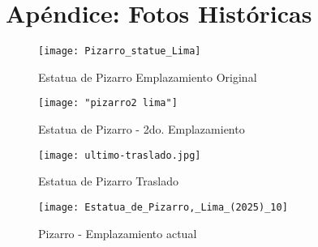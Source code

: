 \documentclass[a4paper,12pt]{article}
\begin{document}
\section*{Ap\'endice: Fotos Hist\'oricas}	
\begin{figure}[H]
	\centering
	\texttt{[image: Pizarro\_statue\_Lima]}
	\caption[Estatua de Pizarro - Ubicación Original]{Estatua de Pizarro Emplazamiento Original}
	\label{fig:pizarrostatuelima}
\end{figure}

\begin{figure}[H]
	\centering
	\texttt{[image: "pizarro2 lima"]}
	\caption[Estatua de pizarro - 2do. Emplazamiento]{Estatua de Pizarro - 2do. Emplazamiento}
	\label{fig:pizarro2-lima}
\end{figure}

\begin{figure}[H]
	\centering
	\texttt{[image: ultimo-traslado.jpg]}
	\caption[Estatua de pizarro -Traslado]{Estatua de Pizarro Traslado}	
\end{figure}

\begin{figure}[H]
		\centering
	\texttt{[image: Estatua\_de\_Pizarro,\_Lima\_(2025)\_10]}
	\caption[Pizarro - Emplazamiento actual]{Pizarro - Emplazamiento actual}
	\label{fig:estatuadepizarrolima202510}
\end{figure}
	
	
\end{document}
